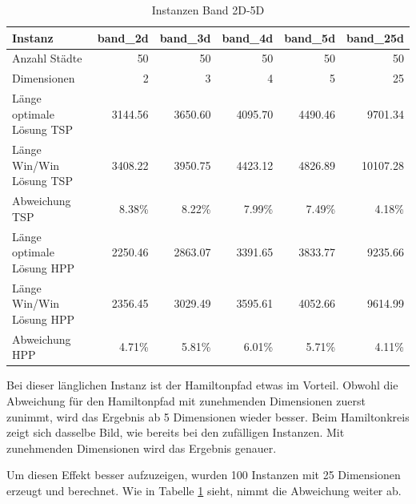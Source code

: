 \documentclass[11pt,a4paper]{article}
\begin{document}
\begin{table}[H]
        \centering
        \begin{tabular}{| l | r | r | r | r | r |}
            \hline
            Instanz                     & \textbf{band\_2d}     
                                        & \textbf{band\_3d}     
                                        & \textbf{band\_4d}     
                                        & \textbf{band\_5d}
                                        & \textbf{band\_25d}             \\ \hline
                Anzahl Städte               & 50        & 50       & 50         & 50        & 50        \\ \hline
                Dimensionen                 & 2         & 3        & 4          & 5         & 25        \\ \hline
                Länge optimale Lösung TSP   & 3144.56   & 3650.60  & 4095.70    & 4490.46   & 9701.34   \\ \hline
                Länge Win/Win Lösung  TSP   & 3408.22   & 3950.75  & 4423.12    & 4826.89   & 10107.28  \\ \hline
                Abweichung TSP              & 8.38\%    &  8.22\%  &  7.99\%    &  7.49\%   &  4.18\%   \\ \hline
                Länge optimale Lösung HPP   & 2250.46   & 2863.07  & 3391.65    & 3833.77   & 9235.66   \\ \hline
                Länge Win/Win Lösung  HPP   & 2356.45   & 3029.49  & 3595.61    & 4052.66   & 9614.99   \\ \hline
                Abweichung HPP              & 4.71\%    &  5.81\%  &  6.01\%    &  5.71\%   &  4.11\%   \\ \hline
        \end{tabular}
        \caption{Instanzen Band 2D-5D}
        \label{tab:instanzen_belt}
\end{table}

Bei dieser länglichen Instanz ist der Hamiltonpfad etwas im Vorteil. Obwohl die Abweichung für den Hamiltonpfad mit zunehmenden Dimensionen zuerst zunimmt, wird das Ergebnis ab 5 Dimensionen wieder besser. Beim Hamiltonkreis zeigt sich dasselbe Bild, wie bereits bei den zufälligen Instanzen. Mit zunehmenden Dimensionen wird das Ergebnis genauer.

Um diesen Effekt besser aufzuzeigen, wurden 100 Instanzen mit 25 Dimensionen erzeugt und berechnet. Wie in Tabelle \ref{tab:instanzen_belt} sieht, nimmt die Abweichung weiter ab.
\end{document}

